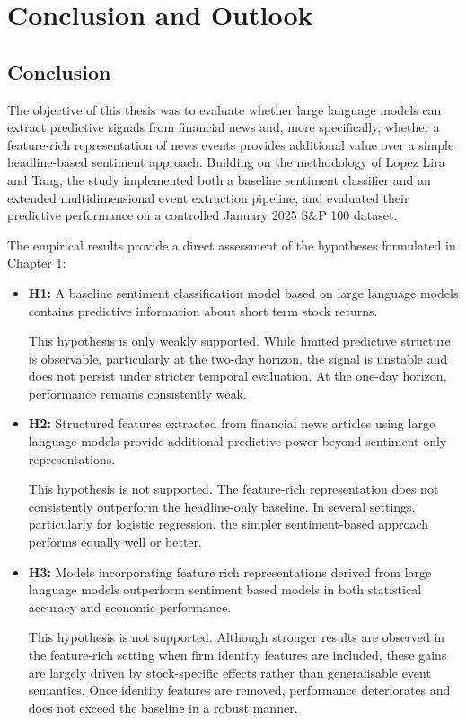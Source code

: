 \chapter{Conclusion and Outlook}

\section{Conclusion}

The objective of this thesis was to evaluate whether large language models can extract predictive signals from financial news and, more specifically, whether a feature-rich representation of news events provides additional value over a simple headline-based sentiment approach. Building on the methodology of Lopez Lira and Tang, the study implemented both a baseline sentiment classifier and an extended multidimensional event extraction pipeline, and evaluated their predictive performance on a controlled January 2025 S\&P 100 dataset.

The empirical results provide a direct assessment of the hypotheses formulated in Chapter 1:

\begin{itemize}
    \item \textbf{H1:} A baseline sentiment classification model based on large language models contains predictive information about short term stock returns.
    
    This hypothesis is only weakly supported. While limited predictive structure is observable, particularly at the two-day horizon, the signal is unstable and does not persist under stricter temporal evaluation. At the one-day horizon, performance remains consistently weak.

    \item \textbf{H2:} Structured features extracted from financial news articles using large language models provide additional predictive power beyond sentiment only representations.
    
    This hypothesis is not supported. The feature-rich representation does not consistently outperform the headline-only baseline. In several settings, particularly for logistic regression, the simpler sentiment-based approach performs equally well or better.

    \item \textbf{H3:} Models incorporating feature rich representations derived from large language models outperform sentiment based models in both statistical accuracy and economic performance.
    
    This hypothesis is not supported. Although stronger results are observed in the feature-rich setting when firm identity features are included, these gains are largely driven by stock-specific effects rather than generalisable event semantics. Once identity features are removed, performance deteriorates and does not exceed the baseline in a robust manner.
\end{itemize}

